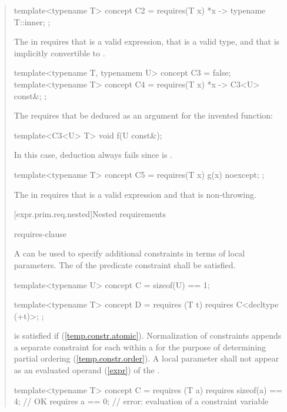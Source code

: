 \begin{quote}
\begin{addedblock}
\begin{codeblock}
template<typename T> concept C2 =
  requires(T x) {
    {*x} -> typename T::inner;
  };
\end{codeblock}

The  in  
requires that  is a valid expression,
that  is a valid type, and
that  is implicitly convertible to
.

\begin{codeblock}
template<typename T, typenamem U> concept C3 = false;
template<typename T> concept C4 =
  requires(T x) {
    {*x} -> C3<U> const&;
  };
\end{codeblock}
The  requires that  be deduced
as an argument for the invented function:
\begin{codeblock}
template<C3<U> T> void f(U const&);
\end{codeblock}
In this case, deduction always fails since  is .

\begin{codeblock}
template<typename T> concept C5 =
  requires(T x) {
    {g(x)} noexcept;
  };
\end{codeblock}

The  in  
requires that  is a valid expression and
that  is non-throwing.
\exitexample


[expr.prim.req.nested]{Nested requirements}

\begin{bnf}
\br
    requires-clause \terminal{;}
  \end{bnf}

\pnum
A  can be used
to specify additional constraints in terms of local parameters.
The  of the predicate constraint 
shall be satisfied.
% 
\enterexample
\begin{codeblock}
template<typename U> concept C = sizeof(U) == 1;

template<typename T> concept D =
  requires (T t) {
    requires C<decltype (+t)>;
  };
\end{codeblock}
 is satisfied if  (\ref{temp.constr.atomic}).
\exitexample
%
\enternote
Normalization of constraints appends a separate constraint for each
 within a 
for the purpose of determining partial ordering (\ref{temp.constr.order}).
\exitnote
%
A local parameter shall not appear as an evaluated operand 
(\ref{expr}) of the .
\enterexample
\begin{codeblock}
template<typename T> 
  concept C = requires (T a) {
    requires sizeof(a) == 4; // OK
    requires a == 0;         // error: evaluation of a constraint variable
  }
\end{codeblock}
\exitexample







\end{addedblock}
\end{quote}
